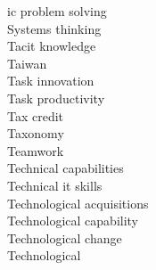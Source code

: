 \documentclass[a4paper]{article}
\begin{document}
\begin{multicols*}{2}
\begin{footnotesize}
ic problem solving \\ Systems thinking \\ Tacit knowledge \\ Taiwan \\ Task innovation \\ Task productivity \\ Tax credit \\ Taxonomy \\ Teamwork \\ Technical capabilities \\ Technical it skills \\ Technological acquisitions \\ Technological capability \\ Technological change \\ Technological
\end{footnotesize}
\end{multicols*}
\end{document}
